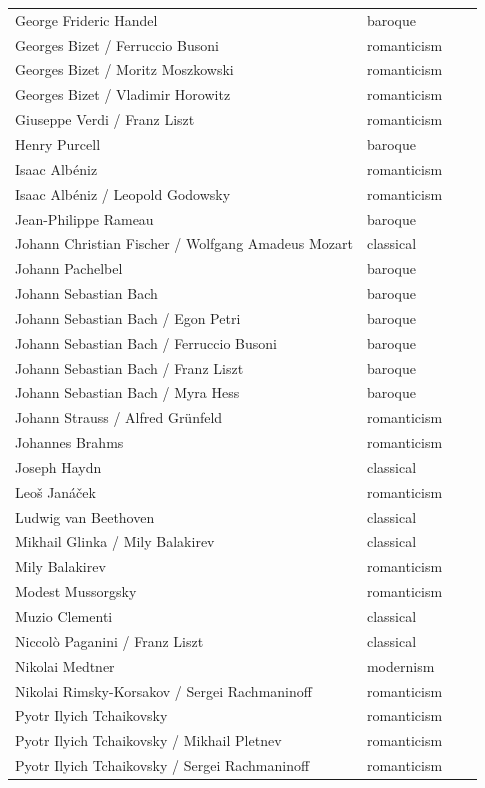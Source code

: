 \documentclass[a4paper]{book}
\begin{document}
\begin{center}
\begin{supertabular}{p{0.75\linewidth}|p{0.25\linewidth}}
George Frideric Handel & baroque \\ 
Georges Bizet / Ferruccio Busoni & romanticism \\ 
Georges Bizet / Moritz Moszkowski & romanticism \\ 
Georges Bizet / Vladimir Horowitz & romanticism \\ 
Giuseppe Verdi / Franz Liszt & romanticism \\ 
Henry Purcell & baroque \\ 
Isaac Albéniz & romanticism \\ 
Isaac Albéniz / Leopold Godowsky & romanticism \\ 
Jean-Philippe Rameau & baroque \\ 
Johann Christian Fischer / Wolfgang Amadeus Mozart & classical \\ 
Johann Pachelbel & baroque \\ 
Johann Sebastian Bach & baroque \\ 
Johann Sebastian Bach / Egon Petri & baroque \\ 
Johann Sebastian Bach / Ferruccio Busoni & baroque \\ 
Johann Sebastian Bach / Franz Liszt & baroque \\ 
Johann Sebastian Bach / Myra Hess & baroque \\ 
Johann Strauss / Alfred Grünfeld & romanticism \\ 
Johannes Brahms & romanticism \\ 
Joseph Haydn & classical \\ 
Leoš Janáček & romanticism \\ 
Ludwig van Beethoven & classical \\ 
Mikhail Glinka / Mily Balakirev & classical \\ 
Mily Balakirev & romanticism \\ 
Modest Mussorgsky & romanticism \\ 
Muzio Clementi & classical \\ 
Niccolò Paganini / Franz Liszt & classical \\ 
Nikolai Medtner & modernism \\ 
Nikolai Rimsky-Korsakov / Sergei Rachmaninoff & romanticism \\ 
Pyotr Ilyich Tchaikovsky & romanticism \\ 
Pyotr Ilyich Tchaikovsky / Mikhail Pletnev & romanticism \\ 
Pyotr Ilyich Tchaikovsky / Sergei Rachmaninoff & romanticism \\ 

\end{supertabular}
\end{center}
\end{document}
